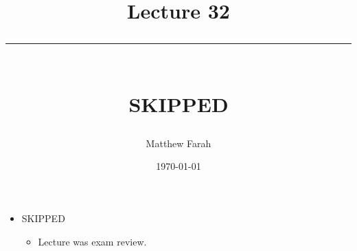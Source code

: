 \documentclass{article}
\date{
	\vspace{-.75em}
	{\large \today}
}
\title{
	\vspace*{-1.5em}
	{\Huge Lecture 32} \\
	\vspace{-1em}
	\rule{\textwidth/4}{.01em} \\
	\vspace{-.25em}
	{\Large SKIPPED}
	\vspace{-.75em}
}
\author{
	{\large Matthew Farah}
}
\begin{document}
\maketitle
\pagestyle{fancy}

\fi


\begin{itemize}
	\item SKIPPED
	\begin{itemize}
		\item Lecture was exam review.
	\end{itemize}
\end{itemize}

\ifdefined\iscombined
	\newpage
\else
	
\end{document}
